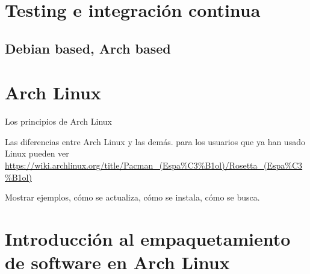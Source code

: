 \section{Testing e integración continua} %

\subsection{Debian based, Arch based}


\section{Arch Linux}


Los principios de Arch Linux

Las diferencias entre Arch Linux y las demás.
para los usuarios que ya han usado Linux pueden ver \url{https://wiki.archlinux.org/title/Pacman_(Espa%C3%B1ol)/Rosetta_(Espa%C3%B1ol)}

Mostrar ejemplos, cómo se actualiza, cómo se instala, cómo se busca.


\section{Introducción al empaquetamiento de software en Arch Linux}

